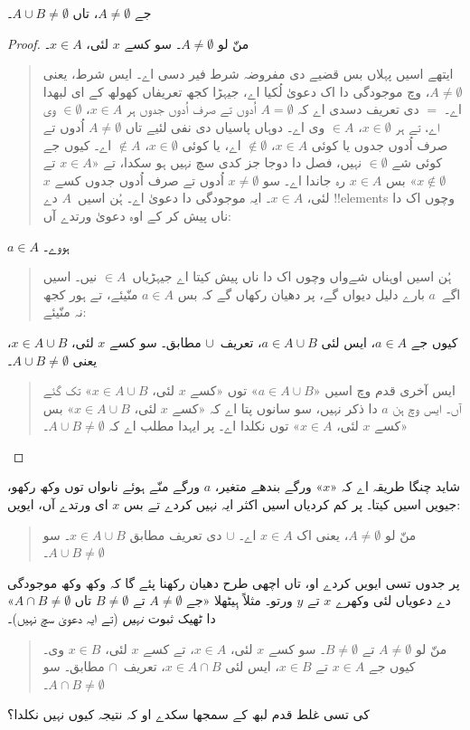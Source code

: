 \documentclass[../../../include/open-logic-section]{subfiles}
\begin{document}
\begin{prop}
جے $A \neq \emptyset$، تاں $A \cup B \neq \emptyset$۔
\end{prop}

\begin{proof}
  منّ لو $A \neq \emptyset$۔ سو کسے $x$ لئی، $x \in A$۔
  \begin{quote}
    ایتھے اسیں پہلاں بس قضیے دی مفروضہ شرط فیر دسی اے۔ ایس شرط، یعنی $A \neq \emptyset$، وچ موجودگی دا اک دعویٰ لُکیا اے، جیہڑا کجھ تعریفاں کھولھ کے ای لبھدا اے۔ $=$ دی تعریف دسدی اے کہ $A = \emptyset$ اُدوں تے صرف اُدوں جدوں ہر $x \in A$، $\in \emptyset$ وی اے، تے ہر $x \in
    \emptyset$، $\in A$ وی اے۔ دوہاں پاسیاں دی نفی لئیے تاں $A \neq
    \emptyset$ اُدوں تے صرف اُدوں جدوں یا کوئی $x \in A$، $\notin \emptyset$ اے، یا کوئی $x \in \emptyset$، $\notin A$ اے۔ کیوں جے کوئی شے $\in \emptyset$ نہیں، فصل دا دوجا جز کدی سچ نہیں ہو سکدا، تے «$x \in A$ تے $x
    \notin \emptyset$» بس $x \in A$ رہ جاندا اے۔ سو $x \neq
    \emptyset$ اُدوں تے صرف اُدوں جدوں کسے $x$ لئی، $x \in A$۔ ایہ موجودگی دا دعویٰ اے۔ ہُن اسیں~$A$ دے !!{element}s وچوں اک دا ناں پیش کر کے اوہ دعویٰ ورتدے آں:
  \end{quote}
  $a \in A$ ہووے۔
  \begin{quote}
    ہُن اسیں اوہناں شےواں وچوں اک دا ناں پیش کیتا اے جیہڑیاں~$\in A$ نیں۔ اسیں اگے~$a$ بارے دلیل دیواں گے، پر دھیان رکھاں گے کہ بس $a \in A$ منّیئے، تے ہور کجھ نہ منّیئے:
  \end{quote}
  کیوں جے $a \in A$، ایس لئی $a \in A \cup B$، تعریف~$\cup$ مطابق۔ سو کسے $x$ لئی، $x \in A \cup B$، یعنی $A \cup B \neq \emptyset$۔
  \begin{quote}
    ایس آخری قدم وچ اسیں «$a \in A \cup B$» توں «کسے $x$ لئی، $x \in A \cup B$» تک گئے آں۔ ایس وچ ہن $a$ دا ذکر نہیں، سو سانوں پتا اے کہ «کسے $x$ لئی، $x \in A \cup B$» بس «کسے $x$ لئی، $x \in A$» توں نکلدا اے۔ پر ایہدا مطلب اے کہ $A \cup B \neq
    \emptyset$۔
  \end{quote}
\end{proof}

شاید چنگا طریقہ اے کہ «$x$» ورگے بندھے متغیر، $a$ ورگے منّے ہوئے ناںواں توں وکھ رکھو، جیویں اسیں کیتا۔ پر کم کردیاں اسیں اکثر ایہ نہیں کردے تے بس $x$ ای ورتدے آں، ایویں:
\begin{quote}
منّ لو $A \neq \emptyset$، یعنی اک $x \in A$ اے۔ $\cup$ دی تعریف مطابق $x \in A \cup B$۔ سو $A \cup B \neq \emptyset$۔
\end{quote}
پر جدوں تسی ایویں کردے او، تاں اچھی طرح دھیان رکھنا پئے گا کہ وکھ وکھ موجودگی دے دعویاں لئی وکھرے $x$ تے $y$ ورتو۔ مثلاً ہِیٹھلا «جے $A \neq
\emptyset$ تے $B \neq \emptyset$ تاں $A \cap B \neq \emptyset$» دا ٹھیک ثبوت \emph{نہیں} (تے ایہ دعویٰ سچ نہیں)۔
\begin{quote}
منّ لو $A \neq \emptyset$ تے $B \neq \emptyset$۔ سو کسے $x$ لئی، $x
\in A$، تے کسے $x$ لئی، $x \in B$ وی۔ کیوں جے $x \in A$ تے $x \in
B$، ایس لئی $x \in A \cap B$، تعریف~$\cap$ مطابق۔ سو $A \cap B \neq
\emptyset$۔
\end{quote}
کی تسی غلط قدم لبھ کے سمجھا سکدے او کہ نتیجہ کیوں نہیں نکلدا؟
\end{document}
